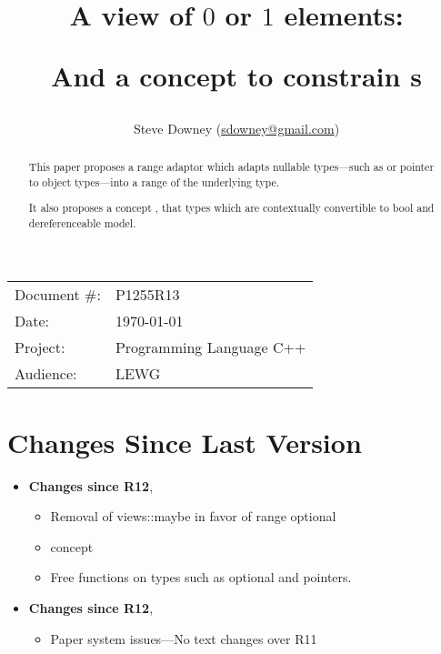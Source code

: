 \documentclass[a4paper,10pt,oneside,openany,final,article]{memoir}
\begin{document}
\title{
  A view of $0$ or $1$ elements: 

  And a concept to constrain s
}
\author{
Steve Downey \small(\href{mailto:sdowney@gmail.com}{sdowney@gmail.com}) \\
}
\date{} %
\maketitle

\begin{flushright}
\begin{tabular}{ll}
  Document \#: & P1255R13 \\
  Date: & \today \\
  Project: & Programming Language C++ \\
  Audience: & LEWG
\end{tabular}
\end{flushright}

\begin{abstract}
  This paper proposes a range adaptor  which adapts nullable types---such as  or pointer to object types---into a range of the underlying type.

  It also proposes a concept , that types which are contextually convertible to bool and dereferenceable model.
\end{abstract}

\tableofcontents*

\chapter*{Changes Since Last Version}

\begin{itemize}
\item \textbf{Changes since R12},
  \begin{itemize}
  \item Removal of views::maybe in favor of range optional
  \item {} concept
  \item Free functions on  types such as optional and pointers.
  \end{itemize}
\item \textbf{Changes since R12},
  \begin{itemize}
  \item Paper system issues---No text changes over R11
  \end{itemize}
\end{itemize}
\end{document}

